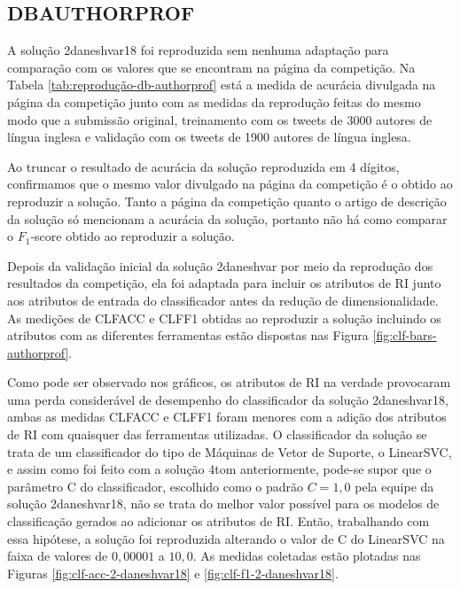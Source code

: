 		\subsection{DB\underscore{}AUTHORPROF}
			A solução 2\underscore{}daneshvar18 foi reproduzida sem nenhuma adaptação para comparação com os valores que se encontram na página da competição.
			Na Tabela \ref{tab:reprodução-db-authorprof} está a medida de acurácia divulgada na página da competição \cite{PAN_APCLEF_2018} junto com as medidas da reprodução feitas do mesmo modo que a submissão original, treinamento com os tweets de 3000 autores de língua inglesa e validação com os tweets de 1900 autores de língua inglesa.

			

			Ao truncar o resultado de acurácia da solução reproduzida em 4 dígitos, confirmamos que o mesmo valor divulgado na página da competição é o obtido ao reproduzir a solução.
			Tanto a página da competição quanto o artigo de descrição da solução \cite{daneshvar:2018} só mencionam a acurácia da solução, portanto não há como comparar o $F_1$-score obtido ao reproduzir a solução.

			Depois da validação inicial da solução 2\underscore{}daneshvar por meio da reprodução dos resultados da competição, ela foi adaptada para incluir os atributos de RI junto aos atributos de entrada do classificador antes da redução de dimensionalidade.
			As medições de CLF\underscore{}ACC e CLF\underscore{}F1 obtidas ao reproduzir a solução incluindo os atributos com as diferentes ferramentas estão dispostas nas Figura \ref{fig:clf-bars-authorprof}.

			




			Como pode ser observado nos gráficos, os atributos de RI na verdade provocaram uma perda considerável de desempenho do classificador da solução 2\underscore{}daneshvar18, ambas as medidas CLF\underscore{}ACC e CLF\underscore{}F1 foram menores com a adição dos atributos de RI com quaisquer das ferramentas utilizadas.
			O classificador da solução se trata de um classificador do tipo de Máquinas de Vetor de Suporte, o LinearSVC, e assim como foi feito com a solução 4\underscore{}tom anteriormente, pode-se supor que o parâmetro C do classificador, escolhido como o padrão $C = 1,0$ pela equipe da solução 2\underscore{}daneshvar18, não se trata do melhor valor possível para os modelos de classificação gerados ao adicionar os atributos de RI.
			Então, trabalhando com essa hipótese, a solução foi reproduzida alterando o valor de C do LinearSVC na faixa de valores de $0,00001$ a $10,0$.
			As medidas coletadas estão plotadas nas Figuras \ref{fig:clf-acc-2-daneshvar18} e \ref{fig:clf-f1-2-daneshvar18}.


